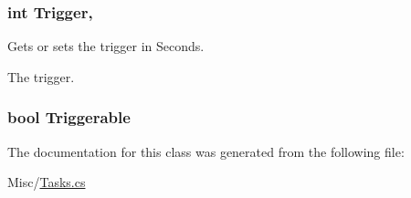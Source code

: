\subsubsection[{Trigger}]{\setlength{\rightskip}{0pt plus 5cm}int Trigger\hspace{0.3cm}{\ttfamily [get]}, {\ttfamily [set]}}\label{classOTA_1_1Misc_1_1Task_af920af1428f98e67fa8ee94e39cc691e}


Gets or sets the trigger in Seconds. 

The trigger. \hypertarget{classOTA_1_1Misc_1_1Task_ac36eb355f2165ad75b4d8f18dc5ee7f8}{}
\subsubsection[{Triggerable}]{\setlength{\rightskip}{0pt plus 5cm}bool Triggerable\hspace{0.3cm}{\ttfamily [get]}}\label{classOTA_1_1Misc_1_1Task_ac36eb355f2165ad75b4d8f18dc5ee7f8}


The documentation for this class was generated from the following file\+:\begin{DoxyCompactItemize}
\item 
Misc/\hyperlink{Tasks_8cs}{Tasks.\+cs}\end{DoxyCompactItemize}
